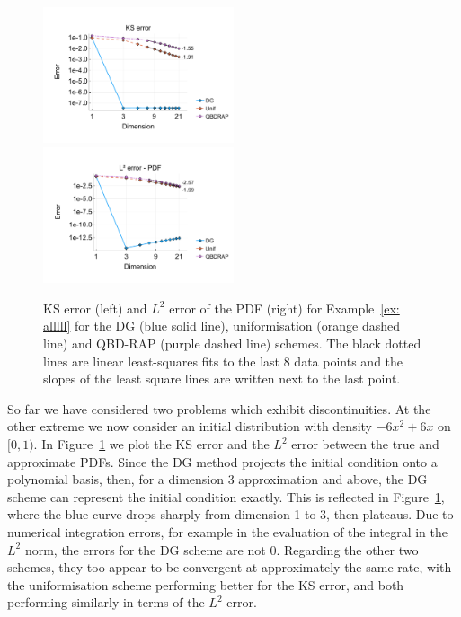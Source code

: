 \begin{example}\label{ex: alllll}
	\begin{figure}[h]
		\centering
		\includegraphics[width=0.5\textwidth,trim={0.5cm 0.8cm 0.2cm 1.25cm},clip]{chapter6/figs/comp/fun6/meshs_ks_error_formatted.pdf}%
		\includegraphics[width=0.5\textwidth,trim={0.5cm 0.8cm 0.2cm 1.25cm},clip]{chapter6/figs/comp/fun6/meshs_l2_pdf_error_formatted.pdf}
		\caption{KS error (left) and \(L^2\) error of the PDF (right) for Example~\ref{ex: alllll} for the DG (blue solid line), uniformisation (orange dashed line) and QBD-RAP (purple dashed line) schemes. The black dotted lines are linear least-squares fits to the last 8 data points and the slopes of the least square lines are written next to the last point.}
		\label{fig: fun 6 comp} 
	\end{figure}
	So far we have considered two problems which exhibit discontinuities. At the other extreme we now consider an initial distribution with density \(-6x^2+6x\) on \([0,1)\). In Figure~\ref{fig: fun 6 comp} we plot the KS error and the \(L^2\) error between the true and approximate PDFs. Since the DG method projects the initial condition onto a polynomial basis, then, for a dimension 3 approximation and above, the DG scheme can represent the initial condition exactly. This is reflected in Figure~\ref{fig: fun 6 comp}, where the blue curve drops sharply from dimension 1 to 3, then plateaus. Due to numerical integration errors, for example in the evaluation of the integral in the \(L^2\) norm, the errors for the DG scheme are not 0. Regarding the other two schemes, they too appear to be convergent at approximately the same rate, with the uniformisation scheme performing better for the KS error, and both performing similarly in terms of the \(L^2\) error. 
\end{example}

